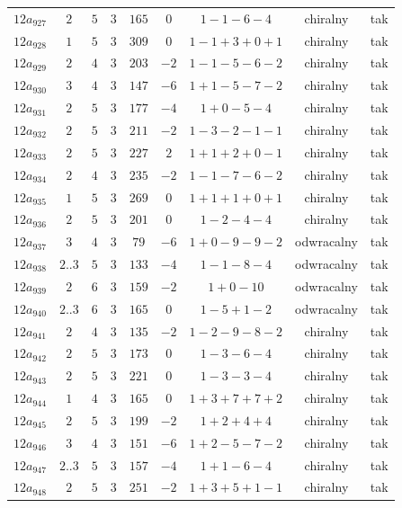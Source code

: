 \begin{longtable}{ccccccccc}
$12a_{927}$ & $2$ & $5$ & $3$ & $165$ & $0$ & $1-1-6-4$ & chiralny & tak \\
$12a_{928}$ & $1$ & $5$ & $3$ & $309$ & $0$ & $1-1+3+0+1$ & chiralny & tak \\
$12a_{929}$ & $2$ & $4$ & $3$ & $203$ & $-2$ & $1-1-5-6-2$ & chiralny & tak \\
$12a_{930}$ & $3$ & $4$ & $3$ & $147$ & $-6$ & $1+1-5-7-2$ & chiralny & tak \\
$12a_{931}$ & $2$ & $5$ & $3$ & $177$ & $-4$ & $1+0-5-4$ & chiralny & tak \\
$12a_{932}$ & $2$ & $5$ & $3$ & $211$ & $-2$ & $1-3-2-1-1$ & chiralny & tak \\
$12a_{933}$ & $2$ & $5$ & $3$ & $227$ & $2$ & $1+1+2+0-1$ & chiralny & tak \\
$12a_{934}$ & $2$ & $4$ & $3$ & $235$ & $-2$ & $1-1-7-6-2$ & chiralny & tak \\
$12a_{935}$ & $1$ & $5$ & $3$ & $269$ & $0$ & $1+1+1+0+1$ & chiralny & tak \\
$12a_{936}$ & $2$ & $5$ & $3$ & $201$ & $0$ & $1-2-4-4$ & chiralny & tak \\
$12a_{937}$ & $3$ & $4$ & $3$ & $79$ & $-6$ & $1+0-9-9-2$ & odwracalny & tak \\
$12a_{938}$ & $2..3$ & $5$ & $3$ & $133$ & $-4$ & $1-1-8-4$ & odwracalny & tak \\
$12a_{939}$ & $2$ & $6$ & $3$ & $159$ & $-2$ & $1+0-10$ & odwracalny & tak \\
$12a_{940}$ & $2..3$ & $6$ & $3$ & $165$ & $0$ & $1-5+1-2$ & odwracalny & tak \\
$12a_{941}$ & $2$ & $4$ & $3$ & $135$ & $-2$ & $1-2-9-8-2$ & chiralny & tak \\
$12a_{942}$ & $2$ & $5$ & $3$ & $173$ & $0$ & $1-3-6-4$ & chiralny & tak \\
$12a_{943}$ & $2$ & $5$ & $3$ & $221$ & $0$ & $1-3-3-4$ & chiralny & tak \\
$12a_{944}$ & $1$ & $4$ & $3$ & $165$ & $0$ & $1+3+7+7+2$ & chiralny & tak \\
$12a_{945}$ & $2$ & $5$ & $3$ & $199$ & $-2$ & $1+2+4+4$ & chiralny & tak \\
$12a_{946}$ & $3$ & $4$ & $3$ & $151$ & $-6$ & $1+2-5-7-2$ & chiralny & tak \\
$12a_{947}$ & $2..3$ & $5$ & $3$ & $157$ & $-4$ & $1+1-6-4$ & chiralny & tak \\
$12a_{948}$ & $2$ & $5$ & $3$ & $251$ & $-2$ & $1+3+5+1-1$ & chiralny & tak \\

\end{longtable}

